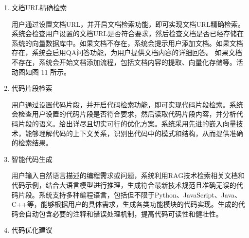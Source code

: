 \documentclass[
    report,     %
    oneside,    %
    UTF8,       %
    zihao=-4    %
]{config} %
\begin{document}
\begin{enumerate}[label=(\arabic*)]
    \item 文档URL精确检索
    
    用户通过设置文档URL，并开启文档检索功能，即可实现文档URL精确检索。系统会检查用户设置的文档URL是否符合要求，然后检查文档是否已经存储在系统的向量数据库中。如果文档不存在，系统会提示用户添加文档。如果文档存在，系统会启用QA问答功能，为用户提供文档内容的详细回答。
    如果文档不存在，系统会开始文档添加流程，包括文档内容的提取、向量化存储等。活动图如图 11 所示。
    
    \item 代码片段检索
    
    用户通过设置代码片段，并开启代码检索功能，即可实现代码片段检索。系统会检查用户设置的代码片段是否符合要求，然后读取代码片段内容，并分析代码片段的语义。给出详尽且切实可行的优化方案。系统采用先进的嵌入向量技术，能够理解代码的上下文关系，识别出代码中的模式和结构，从而提供准确的检索结果。

    \item 智能代码生成

    用户输入自然语言描述的编程需求或问题，系统利用RAG技术检索相关文档和代码示例，结合大语言模型进行推理，生成符合最新技术规范且准确无误的代码片段。系统支持多种编程语言，包括但不限于Python、JavaScript、Java、C++等，能够根据用户的具体需求，生成各类功能模块的代码实现。生成的代码会自动包含必要的注释和错误处理机制，提高代码可读性和健壮性。
    
    \item 代码优化建议
    

\end{enumerate}
\end{document}
